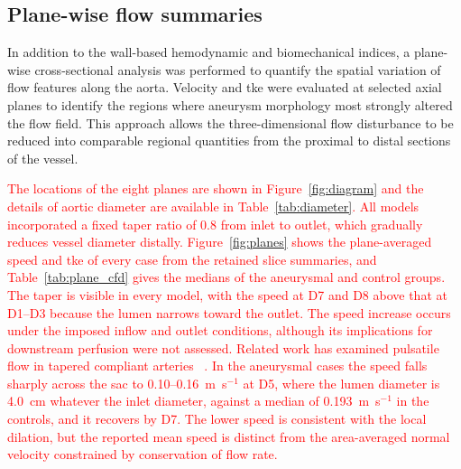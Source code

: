\documentclass[12pt,a4paper]{article}
\newcommand{\TKE}{\ac{tke}\xspace}
\theoremstyle{definition}
\numberwithin{equation}{section}
\newcommand{\revision}[1]{\textcolor{red}{#1}}
\begin{document}


 \subsection{Plane-wise flow summaries}
\label{sec:planes}

In addition to the wall-based hemodynamic and biomechanical indices, a plane-wise cross-sectional analysis was performed to quantify the spatial variation of flow features along the aorta. Velocity and \TKE were evaluated at selected axial planes to identify the regions where aneurysm morphology most strongly altered the flow field. This approach allows the three-dimensional flow disturbance to be reduced into comparable regional quantities from the proximal to distal sections of the vessel.

\revision{The locations of the eight planes are shown in Figure~\ref{fig:diagram} and the details of aortic diameter are available in Table~\ref{tab:diameter}. All models incorporated a fixed taper ratio of 0.8 from inlet to outlet, which gradually reduces vessel diameter distally. Figure~\ref{fig:planes} shows the plane-averaged speed and \TKE of every case from the retained slice summaries, and Table~\ref{tab:plane_cfd} gives the medians of the aneurysmal and control groups. The taper is visible in every model, with the speed at D7 and D8 above that at D1--D3 because the lumen narrows toward the outlet. The speed increase occurs under the imposed inflow and outlet conditions, although its implications for downstream perfusion were not assessed. Related work has examined pulsatile flow in tapered compliant arteries ~\cite{kahveci2015numerical}. In the aneurysmal cases the speed falls sharply across the sac to 0.10--0.16~m~s$^{-1}$ at D5, where the lumen diameter is 4.0~cm whatever the inlet diameter, against a median of 0.193~m~s$^{-1}$ in the controls, and it recovers by D7. The lower speed is consistent with the local dilation, but the reported mean speed is distinct from the area-averaged normal velocity constrained by conservation of flow rate.}
\end{document}
